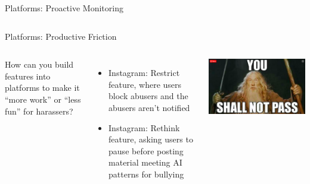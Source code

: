 \documentclass[nobackground,dvipsnames,table]{beamer}
\begin{document}
\begin{frame}{Platforms: Proactive Monitoring}
\begin{columns}
    \end{columns}
\end{frame}

\begin{frame}{Platforms: Productive Friction}
    \begin{columns}
            \small
            How can you build features into platforms to make it “more work” or “less fun” for harassers?
            \begin{itemize}
                \item Instagram: Restrict feature, where users block abusers and the abusers aren’t notified
                \item Instagram: Rethink feature, asking users to pause before posting material meeting AI patterns for bullying
            \end{itemize}
            \includegraphics[width=\textwidth]{you-shall-not-pass}
    \end{columns}
\end{frame}
\end{document}
